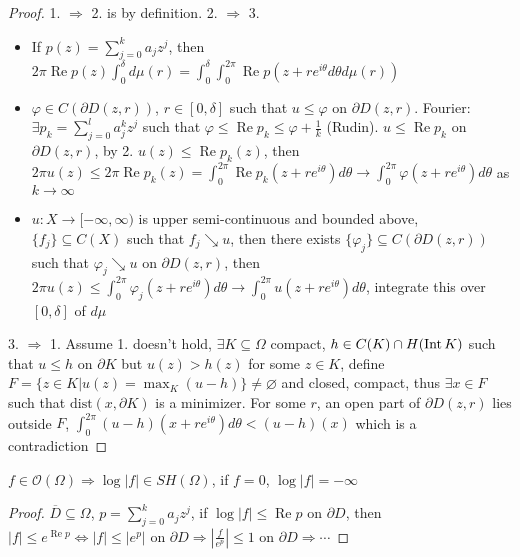 \documentclass[../main.tex]{subfiles}
\begin{document}
\begin{proof}
1. $\Rightarrow$ 2. is by definition. 2. $\Rightarrow$ 3.
\begin{itemize}
\item If $p(z)=\sum_{j=0}^ka_j z^j$, then $\displaystyle2\pi\operatorname{Re}p(z)\int_0^\delta d\mu(r)=\int_0^\delta\int_0^{2\pi}\operatorname{Re}p(z+re^{i\theta}d\theta d\mu(r))$
\item $\varphi\in C(\partial D(z,r))$, $r\in[0,\delta]$ such that $u\leq\varphi$ on $\partial D(z,r)$. Fourier: $\exists p_k=\sum_{j=0}^la_j^kz^j$ such that $\varphi\leq\operatorname{Re}p_k\leq\varphi+\frac{1}{k}$ (Rudin). $u\leq \operatorname{Re}p_k$ on $\partial D(z,r)$, by 2. $u(z)\leq\operatorname{Re}p_k(z)$, then $2\pi u(z)\leq2\pi\operatorname{Re}p_k(z)=\int_0^{2\pi}\operatorname{Re}p_k(z+re^{i\theta})d\theta\to\int_0^{2\pi}\varphi(z+re^{i\theta})d\theta$ as $k\to\infty$
\item $u:X\to[-\infty,\infty)$ is upper semi-continuous and bounded above, $\{f_j\}\subseteq C(X)$ such that $f_j\searrow u$, then there exists $\{\varphi_j\}\subseteq C(\partial D(z,r))$ such that $\varphi_j\searrow u$ on $\partial D(z,r)$, then $2\pi u(z)\leq\int_0^{2\pi}\varphi_j(z+re^{i\theta})d\theta\to\int_0^{2\pi}u(z+re^{i\theta})d\theta$, integrate this over $[0,\delta]$ of $d\mu$
\end{itemize}
3. $\Rightarrow$ 1. Assume 1. doesn't hold, $\exists K\subseteq\Omega$ compact, $h\in C(K)\cap H(\operatorname{Int} K)$ such that $u\leq h$ on $\partial K$ but $u(z)>h(z)$ for some $z\in K$, define $F=\{z\in K|u(z)=\max_K(u-h)\}\neq\varnothing$ and closed, compact, thus $\exists x\in F$ such that $\mathrm{dist}(x,\partial K)$ is a minimizer. For some $r$, an open part of $\partial D(z,r)$ lies outside $F$, $\int_0^{2\pi}(u-h)(x+re^{i\theta})d\theta<(u-h)(x)$ which is a contradiction
\end{proof}

\begin{corollary}
$f\in\mathcal O(\Omega)\Rightarrow\log|f|\in SH(\Omega)$, if $f=0$, $\log|f|=-\infty$
\end{corollary}

\begin{proof}
$\overline D\subseteq\Omega$, $p=\sum_{j=0}^ka_jz^j$, if $\log|f|\leq \operatorname{Re}p$ on $\partial D$, then $|f|\leq e^{\operatorname{Re}p}\Leftrightarrow |f|\leq|e^p|$ on $\partial D\Rightarrow |\frac{f}{e^p}|\leq1$ on $\partial D\Rightarrow\cdots$
\end{proof}
\end{document}
